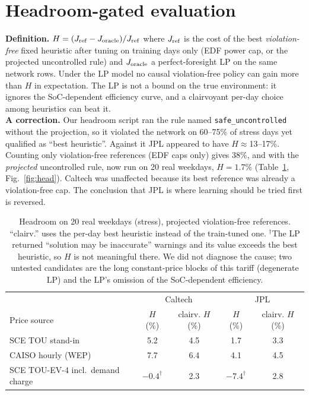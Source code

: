 \documentclass[10pt]{article}
\begin{document}
\section{Headroom-gated evaluation}\label{sec:head}
\textbf{Definition.} $H=(J_{\rm ref}-J_{\rm oracle})/J_{\rm ref}$ where $J_{\rm ref}$ is the cost of the best \emph{violation-free} fixed heuristic after tuning on training days only (EDF power cap, or the projected uncontrolled rule) and $J_{\rm oracle}$ a perfect-foresight LP on the same network rows. Under the LP model no causal violation-free policy can gain more than $H$ in expectation. The LP is not a bound on the true environment: it ignores the SoC-dependent efficiency curve, and a clairvoyant per-day choice among heuristics can beat it.\\
\textbf{A correction.} Our headroom script ran the rule named \texttt{safe\_uncontrolled} without the projection, so it violated the network on 60--75\% of stress days yet qualified as ``best heuristic''. Against it JPL appeared to have $H\approx$13--17\%. Counting only violation-free references (EDF caps only) gives 38\%, and with the \emph{projected} uncontrolled rule, now run on 20 real weekdays, $H=1.7\%$ (Table~\ref{tab:head}, Fig.~\ref{fig:head}). Caltech was unaffected because its best reference was already a violation-free cap. The conclusion that JPL is where learning should be tried first is reversed.
\begin{table}[h]\centering\small
\begin{tabular}{@{}lcccc@{}}\toprule & \multicolumn{2}{c}{Caltech} & \multicolumn{2}{c}{JPL}\\ Price source & $H$ (\%) & clairv. $H$ (\%) & $H$ (\%) & clairv. $H$ (\%)\\\midrule
SCE TOU stand-in & 5.2 & 4.5 & 1.7 & 3.3\\
CAISO hourly (WEP) & 7.7 & 6.4 & 4.1 & 4.5\\
SCE TOU-EV-4 incl.\ demand charge & $-0.4^\dagger$ & 2.3 & $-7.4^\dagger$ & 2.8\\\bottomrule
\end{tabular}\caption{Headroom on 20 real weekdays (stress), projected violation-free references. ``clairv.'' uses the per-day best heuristic instead of the train-tuned one. $^\dagger$The LP returned ``solution may be inaccurate'' warnings and its value exceeds the best heuristic, so $H$ is not meaningful there. We did not diagnose the cause; two untested candidates are the long constant-price blocks of this tariff (degenerate LP) and the LP's omission of the SoC-dependent efficiency.}\label{tab:head}\end{table}
\end{document}
